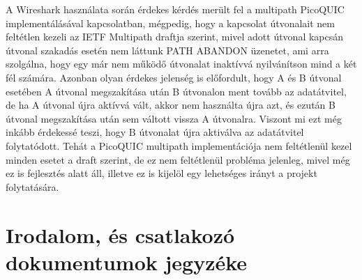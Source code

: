 \documentclass[a4paper,oneside]{article}
\begin{document}
A Wireshark használata során érdekes kérdés merült fel a multipath PicoQUIC implementálásával kapcsolatban,
mégpedig, hogy a kapcsolat útvonalait nem feltétlen kezeli az IETF Multipath draftja szerint, mivel adott útvonal kapcsán útvonal szakadás 
esetén nem láttunk PATH ABANDON üzenetet, ami arra szolgálna, hogy egy már nem működő útvonalat inaktívvá nyilvánítson mind a két fél számára.
Azonban olyan érdekes jelenség is előfordult, hogy A és B útvonal esetében A útvonal megszakítása után B útvonalon ment tovább az adatátvitel,
de ha A útvonal újra aktívvá vált, akkor nem használta újra azt, és ezután B útvonal megszakítása után sem váltott vissza A útvonalra. Viszont mi ezt még inkább
érdekessé teszi, hogy B útvonalat újra aktiválva az adatátvitel folytatódott. Tehát a PicoQUIC multipath implementációja nem feltétlenül
kezel minden esetet a draft szerint, de ez nem feltétlenül probléma jelenleg, mivel még ez is fejlesztés alatt áll, illetve ez is kijelöl egy lehetséges 
irányt a projekt folytatására.


\newpage
 
\section{Irodalom, és csatlakozó dokumentumok jegyzéke}
\label{sec:irod-es-csatl}
\end{document}
